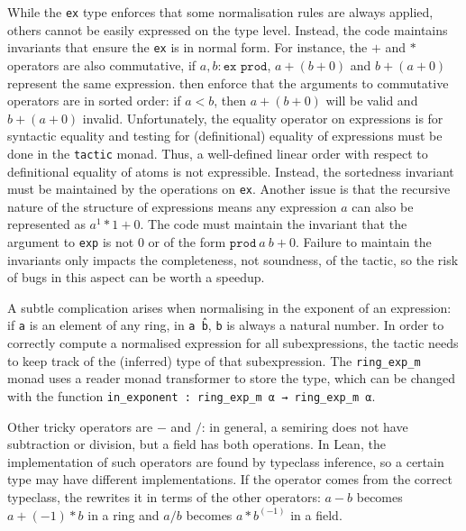 \documentclass{llncs}
\newcommand{\lean}[1]{\texttt{#1}\xspace} %
\newcommand{\ex}{\lean{ex}}
\begin{document}
While the \ex type enforces that some normalisation rules are always applied,
others cannot be easily expressed on the type level.
Instead, the code maintains invariants that ensure the \ex is in normal form.
For instance, the $+$ and $*$ operators are also commutative,
if $a, b : \lean{ex prod}$, $a + (b + 0)$ and $b + (a + 0)$ represent the same expression.
then enforce that the arguments to commutative operators are in sorted order:
if $a < b$, then $a + (b + 0)$ will be valid and $b + (a + 0)$ invalid. 
Unfortunately, the equality operator on expressions is for syntactic equality and
testing for (definitional) equality of expressions must be done in the \lean{tactic} monad.
Thus, a well-defined linear order with respect to definitional equality of atoms is not expressible.
Instead, the sortedness invariant must be maintained by the operations on \ex.
Another issue is that the recursive nature of the structure of expressions
means any expression $a$ can also be represented as $a^1*1 + 0$.
The code must maintain the invariant that the argument to \lean{exp} is not $0$ or of the form $\lean{prod}\ a\ b + 0$.
Failure to maintain the invariants only impacts the completeness, not soundness, of the tactic,
so the risk of bugs in this aspect can be worth a speedup.

A subtle complication arises when normalising in the exponent of an expression:
if \lean{a} is an element of any ring, in \lean{a \^ b}, \lean{b} is always a natural number.
In order to correctly compute a normalised expression for all subexpressions,
the tactic needs to keep track of the (inferred) type of that subexpression.
The \lean{ring\_exp\_m} monad uses a reader monad transformer to store the type,
which can be changed with the function \lean{in\_exponent : ring\_exp\_m α → ring\_exp\_m α}.

Other tricky operators are $-$ and $/$:
in general, a semiring does not have subtraction or division,
but a field has both operations.
In Lean, the implementation of such operators are found by typeclass inference,
so a certain type may have different implementations.
If the operator comes from the correct typeclass,
the rewrites it in terms of the other operators:
$a - b$ becomes $a + (-1) * b$ in a ring
and $a / b$ becomes $a * b^(-1)$ in a field.
\end{document}
